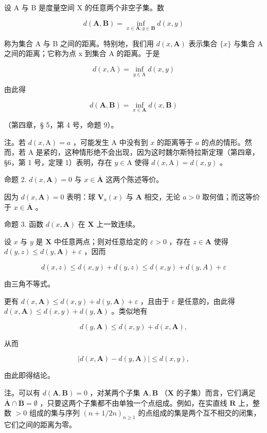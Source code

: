 设 A 与 B 是度量空间 X 的任意两个非空子集。数

\[
d (\mathbf {A}, \mathbf {B}) = \inf _ {x \in \mathbf {A}, y \in \mathbf {B}} d (x, y)
\]

称为集合 A 与 B 之间的距离。特别地，我们用 \(d(x, \mathbf{A})\) 表示集合 \(\{x\}\) 与集合 A 之间的距离；它称为点 x 到集合 A 的距离。于是

\[
d (x, \mathrm{A}) = \inf _ {y \in \mathrm{A}} d (x, y)
\]

由此得

\[
d (\mathbf {A}, \mathbf {B}) = \inf _ {x \in \mathbf {A}} d (x, \mathbf {B})
\]

（第四章，§ 5，第 4 号，命题 9）。

注。若 \(d(x, \mathrm{A}) = a\) ，可能发生 A 中没有到 \(x\) 的距离等于 \(a\) 的点的情形。然而，若 A 是紧的，这种情形绝不会出现，因为这时魏尔斯特拉斯定理（第四章，§6，第 1 号，定理 1）表明，存在 \(y \in \mathrm{A}\) 使得 \(d(x, \mathrm{A}) = d(x, y)\) 。

命题 2. \(d(x, \mathbf{A}) = 0\) 与 \(x \in \overline{\mathbf{A}}\) 这两个陈述等价。

因为 \(d(x, \mathbf{A}) = 0\) 表明：球 \(\mathbf{V}_a(x)\) 与 \(\mathbf{A}\) 相交，无论 \(a > 0\) 取何值；而这等价于 \(x \in \overline{\mathbf{A}}\) 。

命题 3. 函数 \(d(x, \mathbf{A})\) 在 \(\mathbf{X}\) 上一致连续。

设 \(x\) 与 \(y\) 是 \(\mathbf{X}\) 中任意两点；则对任意给定的 \(\varepsilon > 0\) ，存在 \(z \in \mathbf{A}\) 使得 \(d(y, z) \leqslant d(y, \mathbf{A}) + \varepsilon\) ，因而

\[
d (x, z) \leqslant d (x, y) + d (y, z) \leqslant d (x, y) + d (y, A) + \varepsilon
\]

由三角不等式。

更有 \(d(x, \mathbf{A}) \leqslant d(x, y) + d(y, \mathbf{A}) + \varepsilon\) ，且由于 \(\varepsilon\) 是任意的，由此得 \(d(x, \mathbf{A}) \leqslant d(x, y) + d(y, \mathbf{A})\) 。类似地有

\[
d (y, \mathbf {A}) \leqslant d (x, y) + d (x, \mathbf {A}),
\]

从而

\[
\left| d (x, \mathbf {A}) - d (y, \mathbf {A}) \right| \leqslant d (x, y),\tag{2}
\]

由此即得结论。

注。可以有 \(d(\mathbf{A}, \mathbf{B}) = 0\) ，对某两个子集 \(\mathbf{A}, \mathbf{B}\) （\(\mathbf{X}\) 的子集）而言，它们满足 \(\overline{\mathbf{A}} \cap \overline{\mathbf{B}} = \emptyset\) ，只要这两个子集都不由单独一个点组成。例如，在实直线 \(\mathbf{R}\) 上，整数 \(> 0\) 组成的集与序列 \((n + 1/2n)_{n \geqslant 1}\) 的点组成的集是两个互不相交的闭集，它们之间的距离为零。

